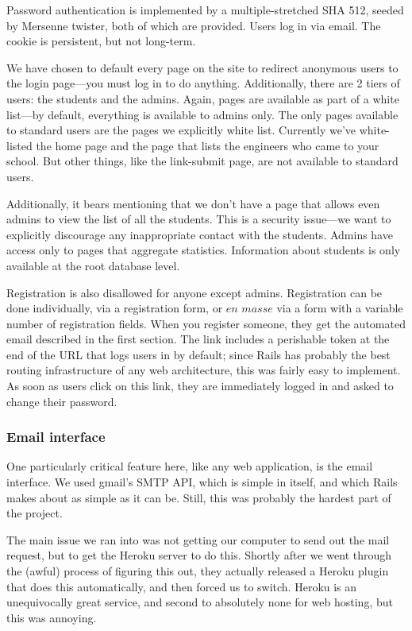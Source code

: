 \documentclass[11pt,a4paper]{article}
\begin{document}
Password authentication is implemented by a multiple-stretched SHA 512, seeded by Mersenne twister, both of which are provided. Users log in via email. The cookie is persistent, but not long-term.

We have chosen to default every page on the site to redirect anonymous users to the login page---you must log in to do anything. Additionally, there are 2 tiers of users: the students and the admins. Again, pages are available as part of a white list---by default, everything is available to admins only. The only pages available to standard users are the pages we explicitly white list. Currently we've white-listed the home page and the page that lists the engineers who came to your school. But other things, like the link-submit page, are not available to standard users.

Additionally, it bears mentioning that we don't have a page that allows even admins to view the list of all the students. This is a security issue---we want to explicitly discourage any inappropriate contact with the students. Admins have access only to pages that aggregate statistics. Information about students is only available at the root database level.

Registration is also disallowed for anyone except admins. Registration can be done individually, via a registration form, or $\textit{en masse}$ via a form with a variable number of registration fields. When you register someone, they get the automated email described in the first section. The link includes a perishable token at the end of the URL that logs users in by default; since Rails has probably the best routing infrastructure of any web architecture, this was fairly easy to implement. As soon as users click on this link, they are immediately logged in and asked to change their password.

\subsubsection{Email interface}

One particularly critical feature here, like any web application, is the email interface. We used gmail's SMTP API, which is simple in itself, and which Rails makes about as simple as it can be. Still, this was probably the hardest part of the project.

The main issue we ran into was not getting our computer to send out the mail request, but to get the Heroku server to do this. Shortly after we went through the (awful) process of figuring this out, they actually released a Heroku plugin that does this automatically, and then forced us to switch. Heroku is an unequivocally great service, and second to absolutely none for web hosting, but this was annoying.
\end{document}
